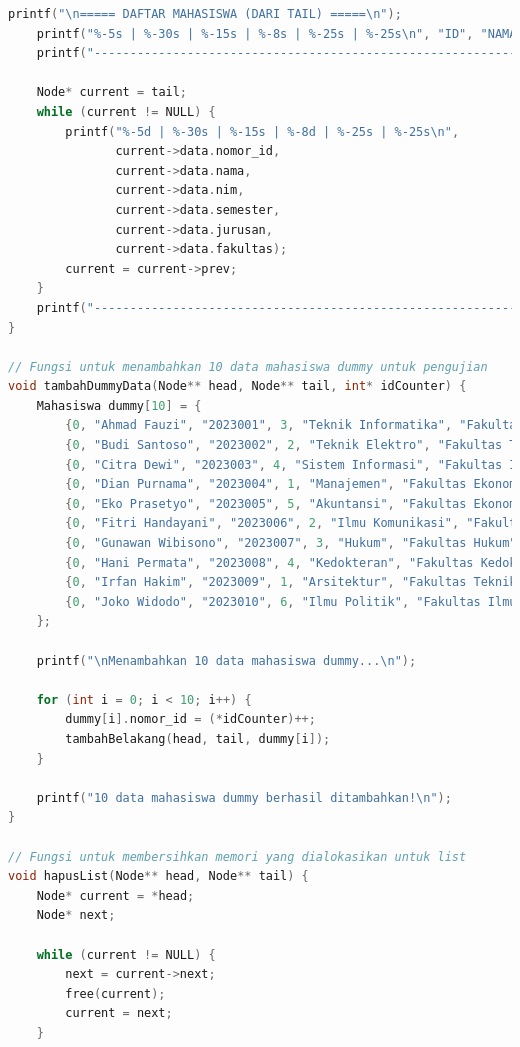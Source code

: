 \documentclass{article}
\begin{document}
\begin{lstlisting}[language=C, caption={Program Double Linked List},
  label={lst:sample-c-code}, basicstyle=\ttfamily\footnotesize,
  keywordstyle=\color{blue}, commentstyle=\color{green},
  stringstyle=\color{red}]
    printf("\n===== DAFTAR MAHASISWA (DARI TAIL) =====\n");
    printf("%-5s | %-30s | %-15s | %-8s | %-25s | %-25s\n", "ID", "NAMA", "NIM", "SEMESTER", "JURUSAN", "FAKULTAS");
    printf("--------------------------------------------------------------------------------------------------------\n");
    
    Node* current = tail;
    while (current != NULL) {
        printf("%-5d | %-30s | %-15s | %-8d | %-25s | %-25s\n",
               current->data.nomor_id,
               current->data.nama,
               current->data.nim,
               current->data.semester,
               current->data.jurusan,
               current->data.fakultas);
        current = current->prev;
    }
    printf("--------------------------------------------------------------------------------------------------------\n");
}

// Fungsi untuk menambahkan 10 data mahasiswa dummy untuk pengujian
void tambahDummyData(Node** head, Node** tail, int* idCounter) {
    Mahasiswa dummy[10] = {
        {0, "Ahmad Fauzi", "2023001", 3, "Teknik Informatika", "Fakultas Ilmu Komputer"},
        {0, "Budi Santoso", "2023002", 2, "Teknik Elektro", "Fakultas Teknik"},
        {0, "Citra Dewi", "2023003", 4, "Sistem Informasi", "Fakultas Ilmu Komputer"},
        {0, "Dian Purnama", "2023004", 1, "Manajemen", "Fakultas Ekonomi"},
        {0, "Eko Prasetyo", "2023005", 5, "Akuntansi", "Fakultas Ekonomi"},
        {0, "Fitri Handayani", "2023006", 2, "Ilmu Komunikasi", "Fakultas Ilmu Sosial"},
        {0, "Gunawan Wibisono", "2023007", 3, "Hukum", "Fakultas Hukum"},
        {0, "Hani Permata", "2023008", 4, "Kedokteran", "Fakultas Kedokteran"},
        {0, "Irfan Hakim", "2023009", 1, "Arsitektur", "Fakultas Teknik"},
        {0, "Joko Widodo", "2023010", 6, "Ilmu Politik", "Fakultas Ilmu Sosial"}
    };
    
    printf("\nMenambahkan 10 data mahasiswa dummy...\n");
    
    for (int i = 0; i < 10; i++) {
        dummy[i].nomor_id = (*idCounter)++;
        tambahBelakang(head, tail, dummy[i]);
    }
    
    printf("10 data mahasiswa dummy berhasil ditambahkan!\n");
}

// Fungsi untuk membersihkan memori yang dialokasikan untuk list
void hapusList(Node** head, Node** tail) {
    Node* current = *head;
    Node* next;
    
    while (current != NULL) {
        next = current->next;
        free(current);
        current = next;
    }
    

\end{lstlisting}
\end{document}
